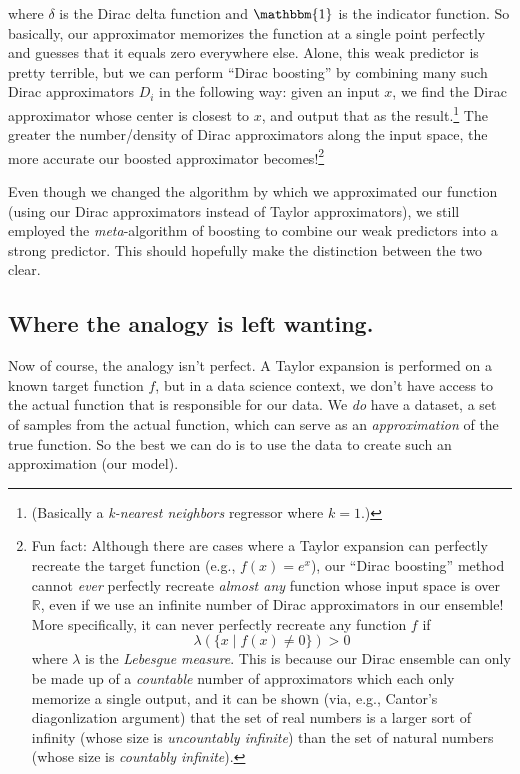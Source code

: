 \documentclass[letterpaper,12pt]{report}
\begin{document}
where \(\delta\) is the Dirac delta function and \(\mathbbm{1}\) is the indicator function.
So basically, our approximator memorizes the function at a single point perfectly and guesses 
that it equals zero everywhere else. Alone, this weak predictor is pretty terrible, but
we can perform ``Dirac boosting'' by combining many such Dirac approximators \(D_i\) in the
following way: given an input \(x\), we find the Dirac approximator whose center is closest
to \(x\), and output that as the result.\footnote{
  (Basically a \emph{k-nearest neighbors} regressor where \(k=1\).)
} 
The greater the number/density of Dirac approximators along the input space,
the more accurate our boosted approximator becomes!\footnote{
  Fun fact: Although there are cases where a Taylor expansion can perfectly recreate the
  target function (e.g., \(f(x) = e^x\)), our ``Dirac boosting'' method cannot \emph{ever}
  perfectly recreate \emph{almost any} function whose input space is over \(\mathbb{R}\), even if
  we use an infinite number of Dirac approximators in our ensemble! More specifically,
  it can never perfectly recreate any function \(f\) if
  \[\lambda\left(\{x \mid f(x) \neq 0\}\right) > 0\]
  where \(\lambda\) is the \emph{Lebesgue measure}.
  This is because 
  our Dirac ensemble can only be made up of a \emph{countable} number of approximators which
  each only memorize a single output, and it can be shown (via, e.g., Cantor's diagonlization
  argument) that the set of real numbers is a larger sort of infinity
  (whose size is 
  \emph{uncountably infinite}) 
  than the set of natural numbers (whose size is
  \emph{countably infinite}).
}

Even though we changed the algorithm by which we approximated our function (using our Dirac
approximators instead of Taylor approximators), we still employed the \emph{meta}-algorithm
of boosting to combine our weak predictors into a strong predictor. This should hopefully make
the distinction between the two clear.

\subsection{Where the analogy is left wanting.}\label{where-the-analogy-is-left-wanting}

Now of course, the analogy isn't perfect. A Taylor expansion is performed on a known target
function \(f\), but in a data science context, we don't have access to the actual
function that is responsible for our data. We \emph{do} have a dataset, a set of samples from
the actual function, which can serve as an \emph{approximation} of the true function.
So the best we can do is to use the data to create such an approximation (our model). 
\end{document}
